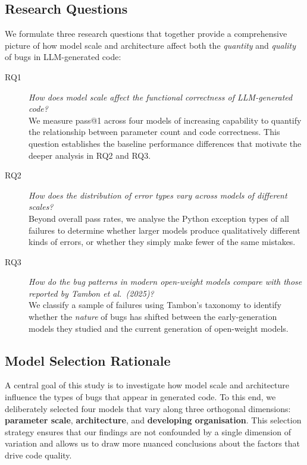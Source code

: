 \documentclass[smallextended]{svjour3}
\begin{document}
\subsection{Research Questions}
\label{sec:rqs}

We formulate three research questions that together provide a comprehensive picture of how model scale and architecture affect both the \emph{quantity} and \emph{quality} of bugs in LLM-generated code:

\begin{description}
    \item[RQ1] \emph{How does model scale affect the functional correctness of LLM-generated code?}\\
    We measure pass@1 across four models of increasing capability to quantify the relationship between parameter count and code correctness. This question establishes the baseline performance differences that motivate the deeper analysis in RQ2 and RQ3.

    \item[RQ2] \emph{How does the distribution of error types vary across models of different scales?}\\
    Beyond overall pass rates, we analyse the Python exception types of all failures to determine whether larger models produce qualitatively different kinds of errors, or whether they simply make fewer of the same mistakes.

    \item[RQ3] \emph{How do the bug patterns in modern open-weight models compare with those reported by Tambon et al.\ (2025)?}\\
    We classify a sample of failures using Tambon's taxonomy to identify whether the \emph{nature} of bugs has shifted between the early-generation models they studied and the current generation of open-weight models.
\end{description}

\subsection{Model Selection Rationale}
\label{sec:model_rationale}

A central goal of this study is to investigate how model scale and architecture influence the types of bugs that appear in generated code. To this end, we deliberately selected four models that vary along three orthogonal dimensions: \textbf{parameter scale}, \textbf{architecture}, and \textbf{developing organisation}. This selection strategy ensures that our findings are not confounded by a single dimension of variation and allows us to draw more nuanced conclusions about the factors that drive code quality.
\end{document}
